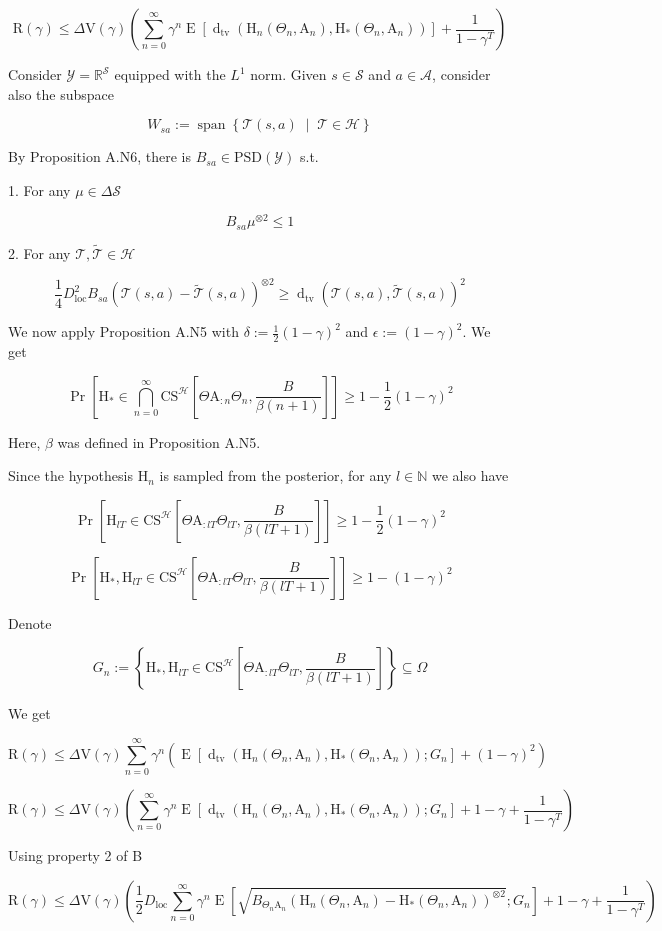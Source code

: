 \documentclass[a4paper]{article}
\DeclareMathOperator{\Sp}{span}
\newcommand{\AP}[1]{\left(#1\right)}
\newcommand{\AB}[1]{\left[#1\right]}
\newcommand{\AC}[1]{\left\{#1\right\}}
\newcommand{\ACM}[2]{\left\{#1\;\middle\vert\;#2\right\}}
\newcommand{\Pa}[2]{\underset{#1}{\operatorname{Pr}}\AB{#2}}
\newcommand{\Ea}[2]{\underset{#1}{\operatorname{E}}\AB{#2}}
\newcommand{\Dtva}[1]{\operatorname{d}_{\text{tv}}\AP{#1}}
\newcommand{\Nats}{\mathbb{N}}
\newcommand{\Reals}{\mathbb{R}}
\newcommand{\PSD}{\mathrm{PSD}}
\newcommand{\B}{B}
\newcommand{\Y}{\mathcal{Y}}
\newcommand{\St}{\mathcal{S}}
\newcommand{\A}{\mathcal{A}}
\newcommand{\T}{\mathcal{T}}
\newcommand{\Hy}{\mathcal{H}}
\newcommand{\DL}{D_{\mathrm{loc}}}
\newcommand{\V}{\mathrm{V}}
\newcommand{\Reg}{\mathrm{R}}
\newcommand{\CS}{\mathrm{CS}}
\newcommand{\AT}{\mathrm{A}}
\newcommand{\THy}{\mathrm{H}_*}
\newcommand{\SHy}{\mathrm{H}}
\newcommand{\CSE}{G}
\begin{document}
$$\Reg(\gamma)\leq\Delta\V(\gamma)\AP{\sum_{n=0}^\infty\gamma^{n}\Ea{}{\Dtva{\SHy_n\AP{\Theta_n,\AT_n},\THy\AP{\Theta_n,\AT_n}} }+\frac{1}{1-\gamma^T}}$$

Consider $\Y=\Reals^\St$ equipped with the $L^1$ norm. Given $s\in\St$ and $a\in\A$, consider also the subspace

$$W_{sa}:=\Sp\ACM{\T(s,a)}{\T\in\Hy}$$

By Proposition A.N6, there is $\B_{sa}\in\PSD\AP{\Y}$ s.t.

1. For any $\mu\in\Delta\St$

$$\B_{sa}\mu^{\otimes2}\leq1$$

2. For any $\T,\tilde{\T}\in\Hy$

$$\frac{1}{4}\DL^2 B_{sa}\AP{\T(s,a)-\tilde{\T}(s,a)}^{\otimes2} \geq \Dtva{\T(s,a),\tilde{\T}(s,a)}^2$$

We now apply Proposition A.N5 with $\delta:=\frac{1}{2}(1-\gamma)^2$ and $\epsilon:=(1-\gamma)^2$. We get

$$\Pa{}{\SHy_*\in\bigcap_{n=0}^\infty\CS^\Hy\AB{\Theta\AT_{:n}\Theta_n,\frac{\B }{\beta(n+1)}}} \geq 1-\frac{1}{2}(1-\gamma)^2$$

Here, $\beta$ was defined in Proposition A.N5.

Since the hypothesis $\SHy_n$ is sampled from the posterior, for any $l\in\Nats$ we also have

$$\Pa{}{\SHy_{lT}\in\CS^\Hy\AB{\Theta\AT_{:lT}\Theta_{lT},\frac{\B }{\beta(lT+1)}}} \geq 1-\frac{1}{2}(1-\gamma)^2$$

$$\Pa{}{\SHy_*,\SHy_{lT}\in\CS^\Hy\AB{\Theta\AT_{:lT}\Theta_{lT},\frac{\B }{\beta(lT+1)}}} \geq 1-(1-\gamma)^2$$

Denote

$$\CSE_n:=\AC{\SHy_*,\SHy_{lT}\in\CS^\Hy\AB{\Theta\AT_{:lT}\Theta_{lT},\frac{\B }{\beta(lT+1)}}}\subseteq\Omega$$

We get

$$\Reg(\gamma)\leq\Delta\V(\gamma)\sum_{n=0}^\infty\gamma^{n}\AP{\Ea{}{\Dtva{\SHy_n\AP{\Theta_n,\AT_n},\THy\AP{\Theta_n,\AT_n}};\CSE_n }+(1-\gamma)^2}$$

$$\Reg(\gamma)\leq\Delta\V(\gamma)\AP{\sum_{n=0}^\infty\gamma^{n}\Ea{}{\Dtva{\SHy_n\AP{\Theta_n,\AT_n},\THy\AP{\Theta_n,\AT_n}};\CSE_n }+1-\gamma+\frac{1}{1-\gamma^T}}$$

Using property 2 of B

$$\Reg(\gamma)\leq\Delta\V(\gamma)\AP{\frac{1}{2}\DL\sum_{n=0}^\infty\gamma^{n}\Ea{}{\sqrt{B_{\Theta_n\AT_n}\AP{\SHy_n\AP{\Theta_n,\AT_n}-\THy\AP{\Theta_n,\AT_n}}^{\otimes2}};\CSE_n }+1-\gamma+\frac{1}{1-\gamma^T}}$$
\end{document}
